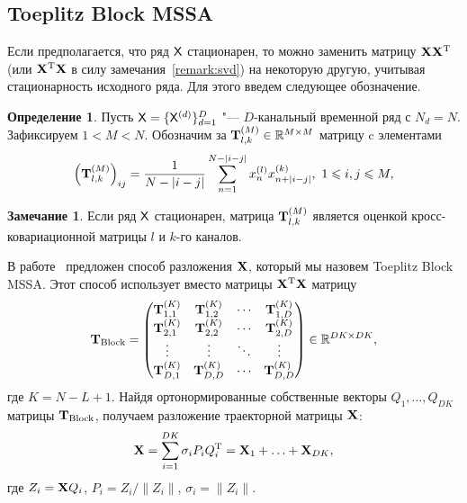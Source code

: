 \documentclass[specialist,
substylefile = spbu_report.rtx,
subf,href,colorlinks=true, 12pt]{disser}
\theoremstyle{definition}
\newtheorem{definition}{Определение}
\newtheorem{remark}{Замечание}
\newcommand{\R}{\mathbb{R}}
\begin{document}
\subsection{Toeplitz Block MSSA}\label{sect:block}
Если предполагается, что ряд $\mathsf{X}$ стационарен, то можно заменить матрицу $\mathbf{X}\mathbf{X}^{\mathrm{T}}$ (или $\mathbf{X}^{\mathrm{T}}\mathbf{X}$ в силу замечания~\ref{remark:svd}) на некоторую другую, учитывая стационарность исходного ряда. Для этого введем следующее обозначение.
\begin{definition}
	Пусть $\mathsf{X}=\{\mathsf{X}^{(d)}\}_{d=1}^D$ "--- $D$-канальный временной ряд с $N_d=N$. Зафиксируем $1<M<N$. Обозначим за $\bfT_{l,k}^{(M)}\in \R^{M\times M}$ матрицу c элементами
	\begin{equation*}\label{eq:block_elements}
		\left(\mathbf{T}^{(M)}_{l,k}\right)_{ij}=\frac{1}{N-|i-j|}\sum_{n=1}^{N-|i-j|} x^{(l)}_nx^{(k)}_{n+|i-j|},\ 1\leqslant i,j\leqslant M,
	\end{equation*}
\end{definition}
\begin{remark}
	Если ряд $\mathsf{X}$ стационарен, матрица $\mathbf{T}_{l,k}^{(M)}$ является оценкой кросс-ковариационной матрицы $l$ и $k$-го каналов.
\end{remark}
В работе~\cite{Plaut1994SpellsOL} предложен способ разложения $\mathbf{X}$, который мы назовем Toeplitz Block MSSA. Этот способ использует вместо матрицы $\mathbf{X}^{\mathrm{T}}\mathbf{X}$ матрицу $$\bfT_{\text{Block}}=\begin{pmatrix}
	\bfT^{(K)}_{1,1} & \bfT^{(K)}_{1,2} & \cdots & \bfT^{(K)}_{1,D} \\
	\bfT^{(K)}_{2,1} & \bfT^{(K)}_{2,2} & \cdots & \bfT^{(K)}_{2,D} \\
	\vdots           & \vdots           & \ddots & \vdots           \\
	\bfT^{(K)}_{D,1} & \bfT^{(K)}_{D,D} & \cdots & \bfT^{(K)}_{D,D}
\end{pmatrix} \in \R^{DK\times DK},$$ где $K = N - L + 1$. Найдя ортонормированные собственные векторы $Q_1,\ldots,Q_{DK}$ матрицы $\mathbf{T}_\text{Block}$, получаем разложение траекторной матрицы $\mathbf{X}$:
\begin{equation}\label{eq:block_decomposition}
	\mathbf{X}=\sum_{i=1}^{DK} \sigma_i P_i Q_i^{\mathrm{T}}=\mathbf{X}_1+\ldots+\mathbf{X}_{DK},
\end{equation}
где $Z_i=\mathbf{X} Q_i$, $P_i=Z_i/\|Z_i\|$, $\sigma_i=\|Z_i\|$.
\end{document}
